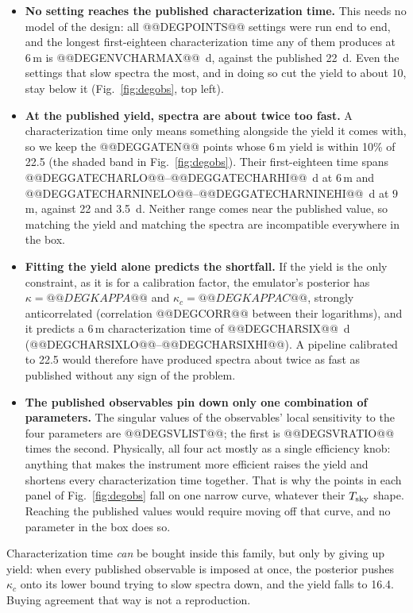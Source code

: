 \documentclass[11pt,a4paper]{article}
\begin{document}
\begin{itemize}
\item \textbf{No setting reaches the published characterization time.} This needs no model of the
  design: all @@DEGPOINTS@@ settings were run end to end, and the longest first-eighteen
  characterization time any of them produces at $6\,$m is @@DEGENVCHARMAX@@~d, against the
  published 22~d. Even the settings that slow spectra the most, and in doing so cut the yield to
  about 10, stay below it (Fig.~\ref{fig:degobs}, top left).
\item \textbf{At the published yield, spectra are about twice too fast.} A characterization time
  only means something alongside the yield it comes with, so we keep the @@DEGGATEN@@ points whose
  $6\,$m yield is within 10\% of 22.5 (the shaded band in Fig.~\ref{fig:degobs}). Their
  first-eighteen time spans @@DEGGATECHARLO@@--@@DEGGATECHARHI@@~d at $6\,$m and
  @@DEGGATECHARNINELO@@--@@DEGGATECHARNINEHI@@~d at $9\,$m, against 22 and 3.5~d. Neither range
  comes near the published value, so matching the yield and matching the spectra are incompatible
  everywhere in the box.
\item \textbf{Fitting the yield alone predicts the shortfall.} If the yield is the only constraint,
  as it is for a calibration factor, the emulator's posterior has $\kappa = @@DEGKAPPA@@$ and
  $\kappa_c = @@DEGKAPPAC@@$, strongly anticorrelated (correlation @@DEGCORR@@ between their
  logarithms), and it predicts a $6\,$m characterization time of @@DEGCHARSIX@@~d
  (@@DEGCHARSIXLO@@--@@DEGCHARSIXHI@@). A pipeline calibrated to 22.5 would therefore have produced
  spectra about twice as fast as published without any sign of the problem.
\item \textbf{The published observables pin down only one combination of parameters.} The
  singular values of the observables' local sensitivity to the four parameters are @@DEGSVLIST@@;
  the first is @@DEGSVRATIO@@ times the second. Physically, all four act mostly as a single
  efficiency knob: anything that makes the instrument more efficient raises the yield and shortens
  every characterization time together. That is why the points in each panel of
  Fig.~\ref{fig:degobs} fall on one narrow curve, whatever their $T_{\rm sky}$ shape. Reaching the
  published values would require moving off that curve, and no parameter in the box does so.
\end{itemize}

Characterization time \emph{can} be bought inside this family, but only by giving up yield: when
every published observable is imposed at once, the posterior pushes $\kappa_c$ onto its lower
bound trying to slow spectra down, and the yield falls to 16.4. Buying agreement that way is not a
reproduction.
\end{document}
